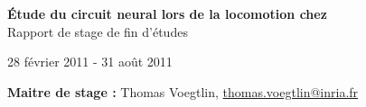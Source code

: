 
\vspace*{\fill}
\begin{center}
   \textbf{ {\Huge Étude du circuit neural lors de la locomotion chez \caeleg{}}}\\[0.5em]{\huge Rapport de stage de fin d'études}
\end{center}

\begin{center}
  28 février 2011 - 31 août 2011
\end{center}

\begin{center}
   \textbf{Maitre de stage :} Thomas Voegtlin, \url{thomas.voegtlin@inria.fr}
\end{center}

\vspace*{\fill}

\newpage
